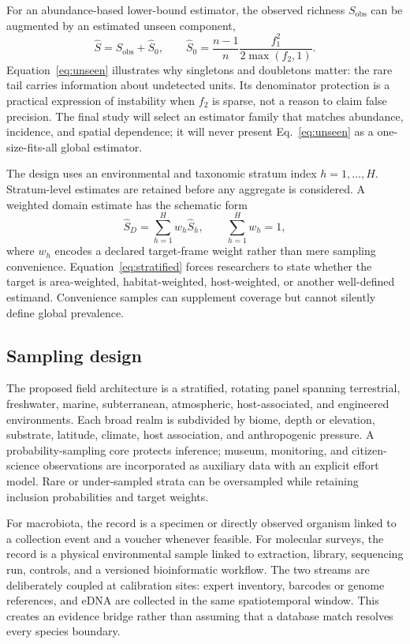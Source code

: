 \documentclass[conference]{IEEEtran}
\begin{document}
For an abundance-based lower-bound estimator, the observed richness $S_{\mathrm{obs}}$ can be augmented by an estimated unseen component,
\begin{equation}
\widehat{S}=S_{\mathrm{obs}}+\widehat{S}_{0}, \qquad
\widehat{S}_{0}=\frac{n-1}{n}\frac{f_1^2}{2\max(f_2,1)}.
\label{eq:unseen}
\end{equation}
Equation~\eqref{eq:unseen} illustrates why singletons and doubletons matter: the rare tail carries information about undetected units. Its denominator protection is a practical expression of instability when $f_2$ is sparse, not a reason to claim false precision. The final study will select an estimator family that matches abundance, incidence, and spatial dependence; it will never present Eq.~\eqref{eq:unseen} as a one-size-fits-all global estimator.

The design uses an environmental and taxonomic stratum index $h=1,\ldots,H$. Stratum-level estimates are retained before any aggregate is considered. A weighted domain estimate has the schematic form
\begin{equation}
\widehat{S}_{D}=\sum_{h=1}^{H}w_h\widehat{S}_{h}, \qquad \sum_{h=1}^{H}w_h=1,
\label{eq:stratified}
\end{equation}
where $w_h$ encodes a declared target-frame weight rather than mere sampling convenience. Equation~\eqref{eq:stratified} forces researchers to state whether the target is area-weighted, habitat-weighted, host-weighted, or another well-defined estimand. Convenience samples can supplement coverage but cannot silently define global prevalence.

\subsection{Sampling design}

The proposed field architecture is a stratified, rotating panel spanning terrestrial, freshwater, marine, subterranean, atmospheric, host-associated, and engineered environments. Each broad realm is subdivided by biome, depth or elevation, substrate, latitude, climate, host association, and anthropogenic pressure. A probability-sampling core protects inference; museum, monitoring, and citizen-science observations are incorporated as auxiliary data with an explicit effort model. Rare or under-sampled strata can be oversampled while retaining inclusion probabilities and target weights.

For macrobiota, the record is a specimen or directly observed organism linked to a collection event and a voucher whenever feasible. For molecular surveys, the record is a physical environmental sample linked to extraction, library, sequencing run, controls, and a versioned bioinformatic workflow. The two streams are deliberately coupled at calibration sites: expert inventory, barcodes or genome references, and eDNA are collected in the same spatiotemporal window. This creates an evidence bridge rather than assuming that a database match resolves every species boundary.
\end{document}
